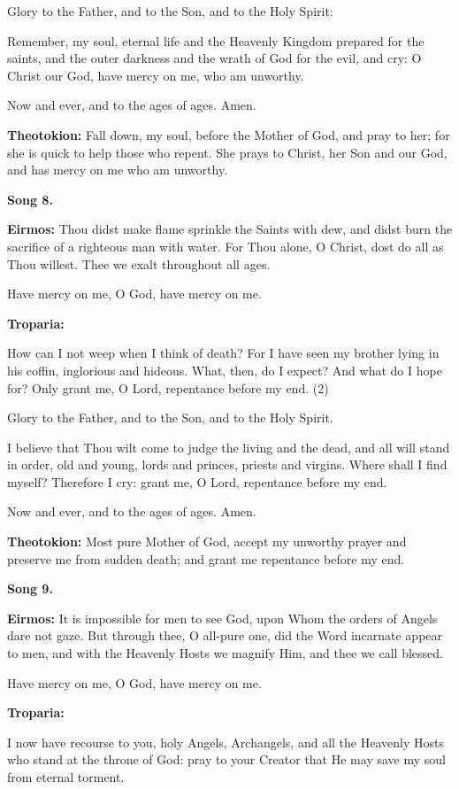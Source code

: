 Glory to the Father, and to the Son, and to the Holy Spirit:

Remember, my soul, eternal life and the Heavenly Kingdom prepared for
the saints, and the outer darkness and the wrath of God for the evil,
and cry: O Christ our God, have mercy on me, who am unworthy.

Now and ever, and to the ages of ages. Amen.

\textbf{Theotokion:} Fall down, my soul, before the Mother of God, and
pray to her; for she is quick to help those who repent. She prays to
Christ, her Son and our God, and has mercy on me who am unworthy.

\textbf{Song 8.}

\textbf{Eirmos:} Thou didst make flame sprinkle the Saints with dew, and
didst burn the sacrifice of a righteous man with water. For Thou alone,
O Christ, dost do all as Thou willest. Thee we exalt throughout all
ages.

Have mercy on me, O God, have mercy on me.

\textbf{Troparia:}

How can I not weep when I think of death? For I have seen my brother
lying in his coffin, inglorious and hideous. What, then, do I expect?
And what do I hope for? Only grant me, O Lord, repentance before my end.
(2)

Glory to the Father, and to the Son, and to the Holy Spirit.

I believe that Thou wilt come to judge the living and the dead, and all
will stand in order, old and young, lords and princes, priests and
virgins. Where shall I find myself? Therefore I cry: grant me, O Lord,
repentance before my end.

Now and ever, and to the ages of ages. Amen.

\textbf{Theotokion:} Most pure Mother of God, accept my unworthy prayer
and preserve me from sudden death; and grant me repentance before my
end.

\textbf{Song 9.}

\textbf{Eirmos:} It is impossible for men to see God, upon Whom the
orders of Angels dare not gaze. But through thee, O all-pure one, did
the Word incarnate appear to men, and with the Heavenly Hosts we magnify
Him, and thee we call blessed.

Have mercy on me, O God, have mercy on me.

\textbf{Troparia:}

I now have recourse to you, holy Angels, Archangels, and all the
Heavenly Hosts who stand at the throne of God: pray to your Creator that
He may save my soul from eternal torment.

